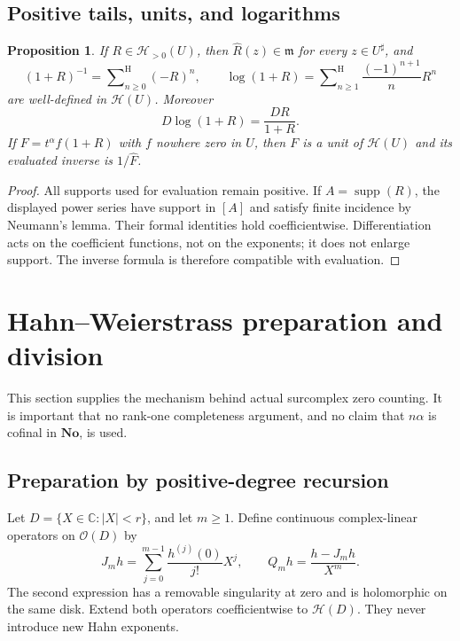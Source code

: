 \documentclass[11pt,oneside]{article}
\newtheorem{proposition}[theorem]{Proposition}
\theoremstyle{definition}\newtheorem{definition}[theorem]{Definition}
\newcommand{\No}{\mathbf{No}}
\newcommand{\C}{\mathbb C}
\newcommand{\HH}{\mathcal H}
\newcommand{\OO}{\mathcal O}
\newcommand{\mm}{\mathfrak m}
\newcommand{\supp}{\operatorname{supp}}
\newcommand{\Hsum}{\mathop{\sum}\nolimits^{\mathrm H}}
\newcommand{\hatF}{\widehat F}
\begin{document}
\subsection{Positive tails, units, and logarithms}
\begin{proposition}\label{prop:positive}
If $R\in\HH_{>0}(U)$, then $\widehat R(z)\in\mm$ for every $z\in U^\sharp$, and
\[
 (1+R)^{-1}=\Hsum_{n\geq0}(-R)^n,\qquad
 \log(1+R)=\Hsum_{n\geq1}\frac{(-1)^{n+1}}n R^n
\]
are well-defined in $\HH(U)$. Moreover
\[
 D\log(1+R)=\frac{DR}{1+R}.
\]
If $F=t^\alpha f(1+R)$ with $f$ nowhere zero in $U$, then $F$ is a unit of $\HH(U)$ and its evaluated inverse is $1/\hatF$.
\end{proposition}
\begin{proof}
All supports used for evaluation remain positive. If $A=\supp(R)$, the displayed power series have support in $[A]$ and satisfy finite incidence by Neumann's lemma. Their formal identities hold coefficientwise. Differentiation acts on the coefficient functions, not on the exponents; it does not enlarge support. The inverse formula is therefore compatible with evaluation.
\end{proof}

\section{Hahn--Weierstrass preparation and division}\label{sec:weierstrass}
This section supplies the mechanism behind actual surcomplex zero counting. It is important that no rank-one completeness argument, and no claim that $n\alpha$ is cofinal in $\No$, is used.

\subsection{Preparation by positive-degree recursion}
Let $D=\{X\in\C:|X|<r\}$, and let $m\geq1$. Define continuous complex-linear operators on $\OO(D)$ by
\[
 J_mh=\sum_{j=0}^{m-1}\frac{h^{(j)}(0)}{j!}X^j,
 \qquad
 Q_mh=\frac{h-J_mh}{X^m}.
\]
The second expression has a removable singularity at zero and is holomorphic on the same disk. Extend both operators coefficientwise to $\HH(D)$. They never introduce new Hahn exponents.
\end{document}
